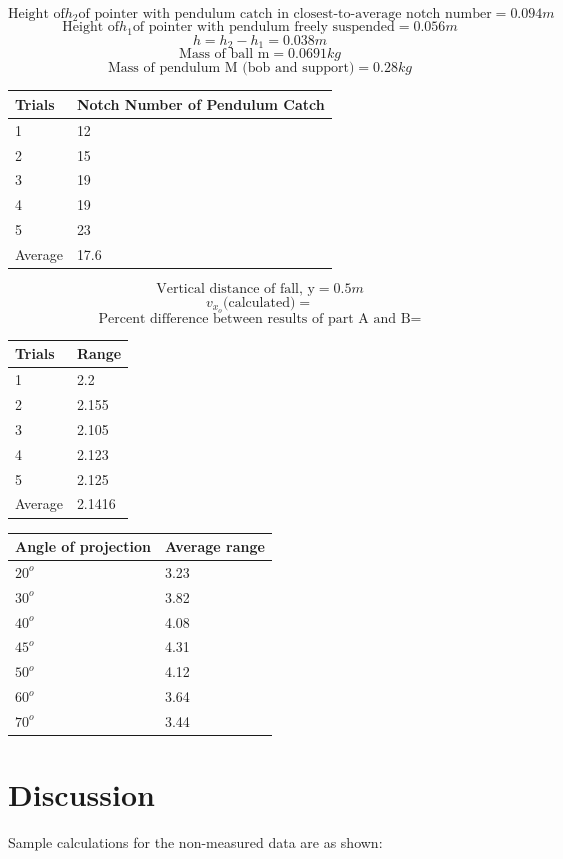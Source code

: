 \documentclass[11pt, titlepage]{article}
\begin{document}
\begin{center}
$$\text{Height of} h_2 \text{of pointer with pendulum catch in closest-to-average notch number} = 0.094 m$$
$$\text{Height of} h_1 \text{of pointer with pendulum freely suspended} = 0.056 m$$
$$h = h_2 - h_1 = 0.038 m$$
$$\text{Mass of ball m} = 0.0691 kg$$
$$\text{Mass of pendulum M (bob and support)} = 0.28 kg$$
\begin{tabular}
{|m{7em}|m{7em}|}
\hline
Trials & Notch Number of Pendulum Catch \\
\hline
1 & 12\\
\hline
2 & 15\\
\hline
3 & 19\\
\hline
4 & 19\\
\hline
5 & 23\\
\hline
Average & 17.6\\
\hline
\end{tabular}

$$\text{Vertical distance of fall, y} = 0.5 m$$
$$v_{x_o} \text{(calculated)} = $$
$$\text{Percent difference between results of part A and B} = $$
\begin{tabular}
{|m{7em}|m{7em}|}
\hline
Trials & Range\\
\hline
1 & 2.2\\
\hline
2 & 2.155\\
\hline
3 & 2.105\\
\hline
4 & 2.123\\
\hline
5 & 2.125\\
\hline
Average & 2.1416\\
\hline
\end{tabular}

\begin{tabular}
{|m{7em}|m{7em}|}
\hline
Angle of projection & Average range \\
\hline
$20^o$ & 3.23\\
\hline
$30^o$ & 3.82\\
\hline
$40^o$ & 4.08\\
\hline
$45^o$ & 4.31\\
\hline
$50^o$ & 4.12\\
\hline
$60^o$ & 3.64\\
\hline
$70^o$ & 3.44\\
\end{tabular}
\end{center}

\section*{Discussion}
Sample calculations for the non-measured data are as shown:
\end{document}

